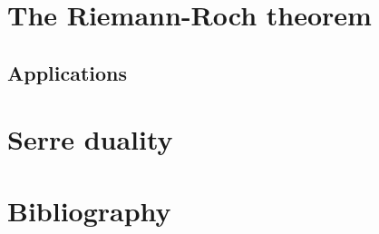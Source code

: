 \documentclass[12pt]{article}
\begin{document}
\section{The Riemann-Roch theorem}
\subsection{Applications}

\section{Serre duality}

\section{Bibliography}
\end{document}
